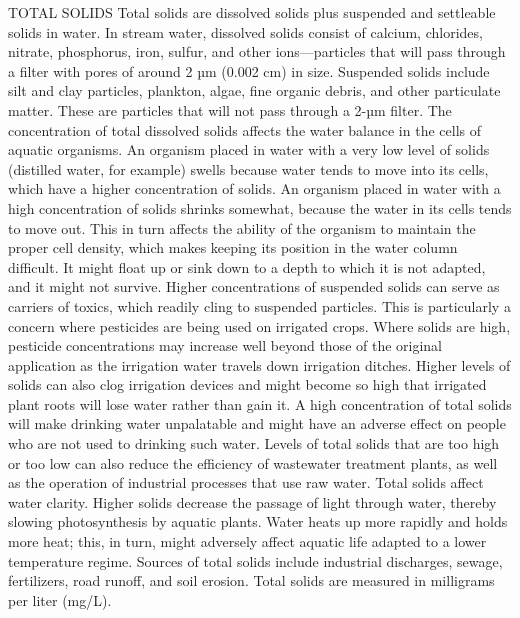 \documentclass{article}
\begin{document}
TOTAL SOLIDS Total solids are dissolved solids plus suspended and
settleable solids in water. In stream water, dissolved solids consist of
calcium, chlorides, nitrate, phosphorus, iron, sulfur, and other
ions---particles that will pass through a filter with pores of around 2
µm (0.002 cm) in size. Suspended solids include silt and clay particles,
plankton, algae, fine organic debris, and other particulate matter.
These are particles that will not pass through a 2-µm filter. The
concentration of total dissolved solids affects the water balance in the
cells of aquatic organisms. An organism placed in water with a very low
level of solids (distilled water, for example) swells because water
tends to move into its cells, which have a higher concentration of
solids. An organism placed in water with a high concentration of solids
shrinks somewhat, because the water in its cells tends to move out. This
in turn affects the ability of the organism to maintain the proper cell
density, which makes keeping its position in the water column difficult.
It might float up or sink down to a depth to which it is not adapted,
and it might not survive. Higher concentrations of suspended solids can
serve as carriers of toxics, which readily cling to suspended particles.
This is particularly a concern where pesticides are being used on
irrigated crops. Where solids are high, pesticide concentrations may
increase well beyond those of the original application as the irrigation
water travels down irrigation ditches. Higher levels of solids can also
clog irrigation devices and might become so high that irrigated plant
roots will lose water rather than gain it. A high concentration of total
solids will make drinking water unpalatable and might have an adverse
effect on people who are not used to drinking such water. Levels of
total solids that are too high or too low can also reduce the efficiency
of wastewater treatment plants, as well as the operation of industrial
processes that use raw water. Total solids affect water clarity. Higher
solids decrease the passage of light through water, thereby slowing
photosynthesis by aquatic plants. Water heats up more rapidly and holds
more heat; this, in turn, might adversely affect aquatic life adapted to
a lower temperature regime. Sources of total solids include industrial
discharges, sewage, fertilizers, road runoff, and soil erosion. Total
solids are measured in milligrams per liter (mg/L).
\end{document}
